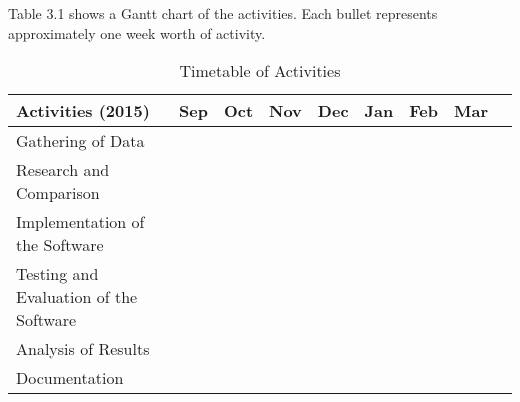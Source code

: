 Table 3.1 shows a Gantt chart of the activities. Each bullet represents approximately one week worth of activity.

%
%
\newcommand{\weekone}{\textbullet}
\newcommand{\weektwo}{\textbullet \textbullet}
\newcommand{\weekthree}{\textbullet \textbullet \textbullet}
\newcommand{\weekfour}{\textbullet \textbullet \textbullet \textbullet}

%
%
\begin{comment}
   \newcommand{\weekone}{$\star$}
   \newcommand{\weektwo}{$\star \star$}
   \newcommand{\weekthree}{$\star \star \star$}
   \newcommand{\weekfour}{$\star \star \star \star$ }
\end{comment}



\begin{table}[ht]   %
\centering
\caption{Timetable of Activities} \vspace{0.25em}
\begin{tabular}{|p{2in}|c|c|c|c|c|c|c|c|} \hline
\centering Activities (2015) & Sep & Oct & Nov & Dec & Jan & Feb & Mar \\ \hline
Gathering of Data      & ~~~\weektwo & \weekfour &  &  &  &  &  \\ \hline
Research and Comparison &   & ~~~\weektwo & \weekfour &  &  &  &  \\ \hline
Implementation of the Software      &   &  & ~~~\weektwo & \weektwo~~~ &  ~~\weekthree &  &  \\ \hline
Testing and Evaluation of the Software     &   &  &  &  & ~~~\weektwo & \weekfour &  \\ \hline
Analysis of Results      &   &  &  &  &  &  & \weekfour \\ \hline
Documentation & ~~~\weektwo  & \weekfour & \weekfour & \weektwo~~~ & ~~\weekthree & \weekfour & \weekfour \\ \hline
\end{tabular}
\label{tab:timetableactivities}
\end{table}

